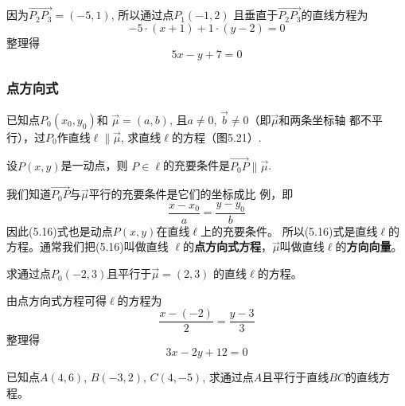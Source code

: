 \begin{solution}
因为$\Vec{P_2P_3}=(-5,1)$, 所以通过点$P_1(-1,2)$
且垂直于$\Vec{P_2P_3}$的直线方程为
\[-5\cdot (x+1)+1\cdot (y-2)=0\]
整理得
\[5x-y+7=0\]
\end{solution}

\subsubsection{点方向式}
已知点$P_0(x_0,y_0)$和
$\vec{\mu}=(a,b)$, 且$a\ne 0$, 
$\vec{b}\ne 0$（即$\vec{\mu}$和两条坐标轴
都不平行），过$P_0$作直线$\ell\parallel \vec{\mu}$, 
求直线$\ell$的方程（图5.21）.

\begin{figure}[htp]
    \centering
{}
    \caption{}
\end{figure}


设$P(x,y)$是一动点，则
$P\in\ell$的充要条件是$\Vec{P_0P}\parallel \vec{\mu}$.

我们知道$\Vec{P_0P}$与$\vec{\mu}$平行的充要条件是它们的坐标成比
例，即
\begin{equation}
    \frac{x-x_0}{a}=\frac{y-y_0}{b}
\end{equation}
因此(5.16)式也是动点$P(x,y)$在直线$\ell$上的充要条件。
所以(5.16)式是直线$\ell$的方程。通常我们把(5.16)叫做直线
$\ell$的\textbf{点方向式方程}，$\vec{\mu}$叫做直线$\ell$的\textbf{方向向量}。

\begin{example}
    求通过点$P_0(-2,3)$且平行于$\vec{\mu}=(2,3)$
的直线$\ell$的方程。
\end{example}

\begin{solution}
    由点方向式方程可得$\ell$的方程为
\[\frac{x -(-2)}{2} =\frac{y-3}{3}\]
整理得
\[3x-2y+12=0\]
\end{solution}

\begin{example}
    已知点$A(4,6)$, $B(-3,2)$, $C(4,-5)$, 
求通过点$A$且平行于直线$BC$的直线方程。
\end{example}

